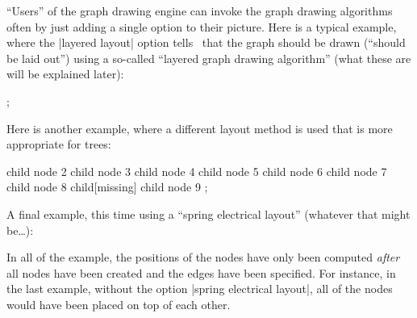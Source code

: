 ``Users'' of the graph drawing engine can invoke the graph drawing algorithms
often by just adding a single option to their picture. Here is a typical
example, where the |layered layout| option tells \tikzname\ that the graph
should be drawn (``should be laid out'') using a so-called ``layered graph
drawing algorithm'' (what these are will be explained later):
%
\begin{codeexample}[preamble={\usetikzlibrary{arrows.spaced,graphs,graphdrawing}
\usegdlibrary{layered}}]
\tikz [>=spaced stealth']
  ;
\end{codeexample}
%
Here is another example, where a different layout method is used that is more
appropriate for trees:
%
\begin{codeexample}[preamble={\usetikzlibrary{graphdrawing}
\usegdlibrary{trees}}]
\tikz [grow'=up, binary tree layout, nodes={circle,draw}]
  child { node {2}
    child { node {3} }
    child { node {4}
      child { node {5} }
      child { node {6} }
    }
  }
  child { node {7}
    child { node {8}
      child[missing]
      child { node {9} }
    }
  };
\end{codeexample}
%
A final example, this time using a ``spring electrical layout'' (whatever that
might be\dots):
%
\begin{codeexample}[
    preamble={\usetikzlibrary{decorations.pathmorphing,graphdrawing}
\usegdlibrary{force}}]
\end{codeexample}
%
In all of the example, the positions of the nodes have only been computed
\emph{after} all nodes have been created and the edges have been specified. For
instance, in the last example, without the option |spring electrical layout|,
all of the nodes would have been placed on top of each other.


